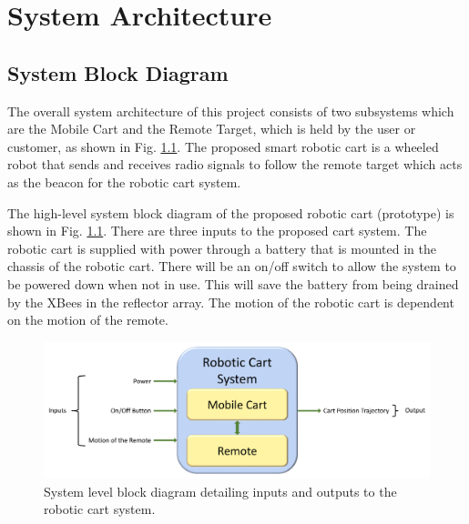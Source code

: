 \chapter{System Architecture}
\label{ch: Chapter2}

\section{System Block Diagram}
The overall system architecture of this project consists of two subsystems which
are the Mobile Cart and the Remote Target, which is held by the user or
customer, as shown in Fig. \ref{fig:sys_block_diag}. The proposed smart robotic
cart is a wheeled robot that sends and receives radio signals to follow the
remote target which acts as the beacon for the robotic cart system.

\vspace*{12pt}
\noindent
The high-level system block diagram of the proposed robotic cart (prototype) is shown in Fig. \ref{fig:sys_block_diag}. There are three inputs to the proposed cart system. The robotic cart is supplied with power through a battery that is mounted in the chassis of the robotic cart. There will be an on/off switch to allow the system to be powered down when not in use. This will save the battery from being drained by the XBees in the reflector array. The motion of the robotic cart is dependent on the motion of the remote.

\begin{figure}[H]
  \centering
  \includegraphics[width=\textwidth]{figs/systemBlockDiagram.pdf}
  \caption{System level block diagram detailing inputs and outputs to the
    robotic cart system.}
	\label{fig:sys_block_diag}
\end{figure}

